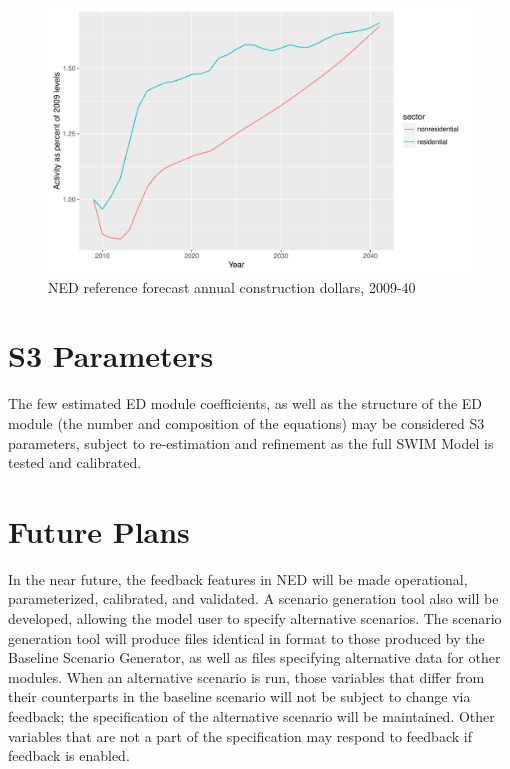 \begin{figure}
\centering
\includegraphics[width=6.5in]{ned/construction_forecast}
\caption{NED reference forecast annual construction dollars, 2009-40}
\label{fig:ned-construction-trends}
\end{figure}

\section{S3 Parameters}
The few estimated ED module coefficients, as well as the structure of the ED module (the number and composition of the equations) may be considered S3 parameters, subject to re-estimation and refinement as the full SWIM Model is tested and calibrated.

\section{Future Plans}
In the near future, the feedback features in NED will be made operational, parameterized, calibrated, and validated. A scenario generation tool also will be developed, allowing the model user to specify alternative scenarios. The scenario generation tool will produce files identical in format to those produced by the Baseline Scenario Generator, as well as files specifying alternative data for other modules. When an alternative scenario is run, those variables that differ from their counterparts in the baseline scenario will not be subject to change via feedback; the specification of the alternative scenario will be maintained. Other variables that are not a part of the specification may respond to feedback if feedback is enabled.

